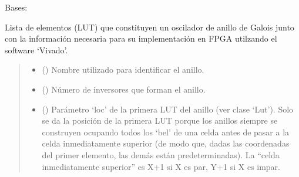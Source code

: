 \documentclass[letterpaper,10pt,english]{sphinxmanual}
\begin{document}
\begin{fulllineitems}
\label{\detokenize{fpga.ring_osc:fpga.ring_osc.GaloisRing}}
\pysigstartsignatures
{}
\pysigstopsignatures
\sphinxAtStartPar
Bases: 

\sphinxAtStartPar
Lista de elementos (LUT) que constituyen un oscilador de anillo de Galois junto con la información necesaria para su implementación en FPGA utilzando el software ‘Vivado’.
\begin{quote}\begin{description}
\begin{itemize}
\item {} 
\sphinxAtStartPar
{} () \textendash{} Nombre utilizado para identificar el anillo.

\item {} 
\sphinxAtStartPar
{} () \textendash{} Número de inversores que forman el anillo.

\item {} 
\sphinxAtStartPar
{} () \textendash{} Parámetro ‘loc’ de la primera LUT del anillo (ver clase ‘Lut’). Solo se da la posición de la primera LUT porque los anillos siempre se construyen ocupando todos los ‘bel’ de una celda antes de pasar a la celda inmediatamente superior (de modo que, dadas las coordenadas del primer elemento, las demás están predeterminadas). La “celda inmediatamente superior” es X+1 si X es par, Y+1 si X es impar.


\end{itemize}
\end{description}
\end{quote}
\end{fulllineitems}
\end{document}
